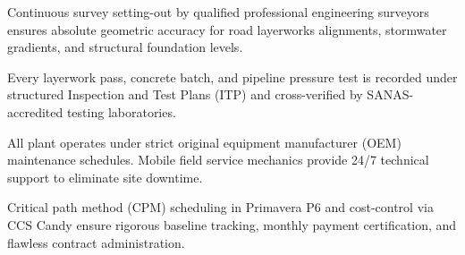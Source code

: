 \documentclass[a4paper,11pt]{article}
\providecommand{\faShieldAlt}{\faShield*}
\begin{document}
\vfill

\noindent
\begin{minipage}[t]{0.485\textwidth}
    \begin{tcolorbox}[enhanced, colback=white, colframe=mhlightgray, boxrule=0.8pt, arc=4pt, title={\bfseries\color{white}\faCrosshairs\ In-House Engineering Survey Control}, colbacktitle=mhnavy, left=8pt, right=8pt, top=7pt, bottom=7pt, drop shadow=black!4]
        {\fontsize{8.1pt}{11.3pt}\selectfont\color{mhtext}
        Continuous survey setting-out by qualified professional engineering surveyors ensures absolute geometric accuracy for road layerworks alignments, stormwater gradients, and structural foundation levels.
        }
    \end{tcolorbox}
\end{minipage}
\hfill
\begin{minipage}[t]{0.485\textwidth}
    \begin{tcolorbox}[enhanced, colback=white, colframe=mhlightgray, boxrule=0.8pt, arc=4pt, title={\bfseries\color{white}\faFlask\ Quality Control \& Laboratory Verification}, colbacktitle=mhblue, left=8pt, right=8pt, top=7pt, bottom=7pt, drop shadow=black!4]
        {\fontsize{8.1pt}{11.3pt}\selectfont\color{mhtext}
        Every layerwork pass, concrete batch, and pipeline pressure test is recorded under structured Inspection and Test Plans (ITP) and cross-verified by SANAS-accredited testing laboratories.
        }
    \end{tcolorbox}
\end{minipage}

\vspace{0.18cm}

\noindent
\begin{minipage}[t]{0.485\textwidth}
    \begin{tcolorbox}[enhanced, colback=white, colframe=mhlightgray, boxrule=0.8pt, arc=4pt, title={\bfseries\color{white}\faShieldAlt\ Preventive Maintenance Governance}, colbacktitle=mhnavy, left=8pt, right=8pt, top=7pt, bottom=7pt, drop shadow=black!4]
        {\fontsize{8.1pt}{11.3pt}\selectfont\color{mhtext}
        All plant operates under strict original equipment manufacturer (OEM) maintenance schedules. Mobile field service mechanics provide 24/7 technical support to eliminate site downtime.
        }
    \end{tcolorbox}
\end{minipage}
\hfill
\begin{minipage}[t]{0.485\textwidth}
    \begin{tcolorbox}[enhanced, colback=white, colframe=mhlightgray, boxrule=0.8pt, arc=4pt, title={\bfseries\color{white}\faProjectDiagram\ EPCM Project Management Governance}, colbacktitle=mhblue, left=8pt, right=8pt, top=7pt, bottom=7pt, drop shadow=black!4]
        {\fontsize{8.1pt}{11.3pt}\selectfont\color{mhtext}
        Critical path method (CPM) scheduling in Primavera P6 and cost-control via CCS Candy ensure rigorous baseline tracking, monthly payment certification, and flawless contract administration.
        }
    \end{tcolorbox}
\end{minipage}
\end{document}
